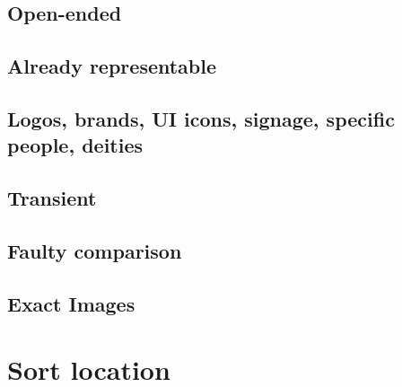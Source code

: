 \documentclass{article}
\begin{document}
\subsection{Open-ended}
\subsection{Already representable}
\subsection{Logos, brands, UI icons, signage, specific people, deities}
\subsection{Transient}
\subsection{Faulty comparison}
\subsection{Exact Images}

\section{Sort location}
\end{document}
